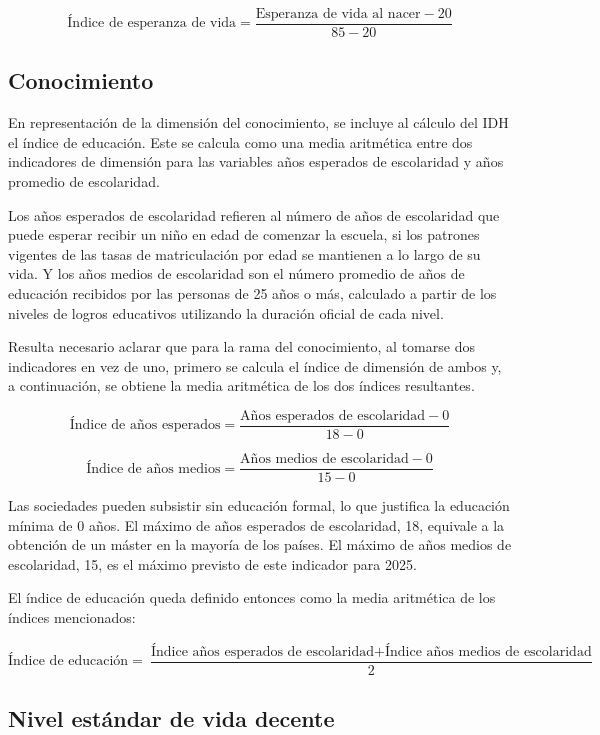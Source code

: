 \documentclass[
  10pt,
]{article}
\begin{document}
\[\text{Índice de esperanza de vida} = \frac{\text{Esperanza de vida al nacer}-20}{85-20}\]

\subsection{Conocimiento}\label{conocimiento}

En representación de la dimensión del conocimiento, se incluye al
cálculo del IDH el índice de educación. Este se calcula como una media
aritmética entre dos indicadores de dimensión para las variables años
esperados de escolaridad y años promedio de escolaridad.

Los años esperados de escolaridad refieren al número de años de
escolaridad que puede esperar recibir un niño en edad de comenzar la
escuela, si los patrones vigentes de las tasas de matriculación por edad
se mantienen a lo largo de su vida. Y los años medios de escolaridad son
el número promedio de años de educación recibidos por las personas de 25
años o más, calculado a partir de los niveles de logros educativos
utilizando la duración oficial de cada nivel.

Resulta necesario aclarar que para la rama del conocimiento, al tomarse
dos indicadores en vez de uno, primero se calcula el índice de dimensión
de ambos y, a continuación, se obtiene la media aritmética de los dos
índices resultantes.

\[\text{Índice de años esperados} = \frac{\text{Años esperados de escolaridad}-0}{18-0}\]

\[\text{Índice de años medios} = \frac{\text{Años medios de escolaridad}-0}{15-0}\]

Las sociedades pueden subsistir sin educación formal, lo que justifica
la educación mínima de 0 años. El máximo de años esperados de
escolaridad, 18, equivale a la obtención de un máster en la mayoría de
los países. El máximo de años medios de escolaridad, 15, es el máximo
previsto de este indicador para 2025.

El índice de educación queda definido entonces como la media aritmética
de los índices mencionados:

\[\text{Índice de educación} = \frac{\text{Índice años esperados de escolaridad}+\text{Índice años medios de escolaridad}}{2}\]

\subsection{Nivel estándar de vida
decente}\label{nivel-estuxe1ndar-de-vida-decente}
\end{document}
